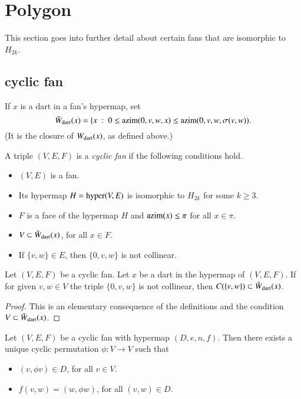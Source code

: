 \section{Polygon}

This section goes into further detail about certain fans that are isomorphic to $H_{2k}$.

\subsection{cyclic fan}

If $x$ is a dart in a fan's hypermap, set
$$
\bar W_{\text{dart}}(x) = \{ x\ :\  0\le {\operatorname{azim}}(0,v,w,x)\le {\operatorname{azim}}(0,v,w,\sigma(v,w)).
$$
(It is the closure of $W_{\text{dart}}(x)$, as defined above.)

\begin{definition}  A triple $(V,E,F)$ is a {\it cyclic fan} if the following conditions hold.
\begin{itemize} 
\item $(V,E)$ is a fan.
\item Its hypermap $H={\operatorname{hyper}}(V,E)$ is isomorphic to $H_{2k}$ for some $k\ge 3$.
\item $F$ is a face of the hypermap $H$ and ${\operatorname{azim}}(x)\le \pi$ for all $x\in \pi$.
\item $V\subset \bar W_{\text{dart}}(x)$, for all $x\in F$.
\item If $\{v,w\}\in E$, then $\{0,v,w\}$ is not collinear.
\end{itemize}
\end{definition}


\begin{lemma}  Let $(V,E,F)$ be a cyclic fan.  Let $x$ be a dart in the hypermap of $(V,E,F)$.  If for given $v,w\in V$  the triple $\{0,v,w\}$ is not collinear, then $C(\{v,w\}) \subset \bar W_{\text{dart}}(x)$.
\end{lemma}

\begin{proof}  This is an elementary consequence of the definitions and the condition $V\subset \bar W_{\text{dart}}(x)$.
\end{proof}

\begin{lemma}  Let $(V,E,F)$ be a cyclic fan with hypermap $(D,e,n,f)$.  Then there exists a unique cyclic permutation $\phi:V\to V$ such that
\begin{itemize}
\item $(v,\phi v)\in D$, for all $v\in V$.
\item $f(v,w) = (w,\phi w)$, for all $(v,w)\in D$.
\end{itemize}
\end{lemma}

